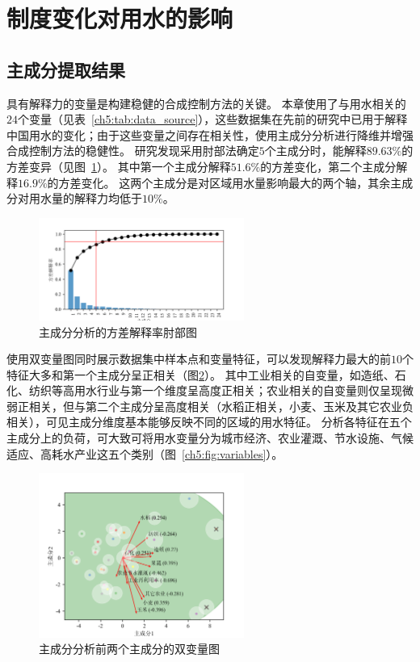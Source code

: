 

\section{制度变化对用水的影响}

\subsection{主成分提取结果}

具有解释力的变量是构建稳健的合成控制方法的关键。
本章使用了与用水相关的$24$个变量（见表~\ref{ch5:tab:data_source}），这些数据集在先前的研究中已用于解释中国用水的变化\cite{zhou2020}；由于这些变量之间存在相关性，使用主成分分析进行降维并增强合成控制方法的稳健性。
研究发现采用肘部法确定$5$个主成分时，能解释$89.63\%$的方差变异（见图~\ref{ch5:fig:elbow}）。
其中第一个主成分解释$51.6\%$的方差变化，第二个主成分解释$16.9\%$的方差变化。
这两个主成分是对区域用水量影响最大的两个轴，其余主成分对用水量的解释力均低于$10\%$。

\begin{figure}[htb]
    \centering
    \includegraphics[width=0.6\textwidth]{img/ch5/ch5_elbow.png}
    \caption{主成分分析的方差解释率肘部图}\label{ch5:fig:elbow}
\end{figure}

使用双变量图同时展示数据集中样本点和变量特征，可以发现解释力最大的前$10$个特征大多和第一个主成分呈正相关（图\ref{ch5:fig:biplot}）。
其中工业相关的自变量，如造纸、石化、纺织等高用水行业与第一个维度呈高度正相关；农业相关的自变量则仅呈现微弱正相关，但与第二个主成分呈高度相关（水稻正相关，小麦、玉米及其它农业负相关），可见主成分维度基本能够反映不同的区域的用水特征。
分析各特征在五个主成分上的负荷，可大致可将用水变量分为城市经济、农业灌溉、节水设施、气候适应、高耗水产业这五个类别（图~\ref{ch5:fig:variables}）。


\begin{figure}[htb]
    \centering
    \includegraphics[width=0.6\textwidth]{img/ch5/ch5_biplot.png}
    \caption{主成分分析前两个主成分的双变量图}\label{ch5:fig:biplot}
\end{figure}



